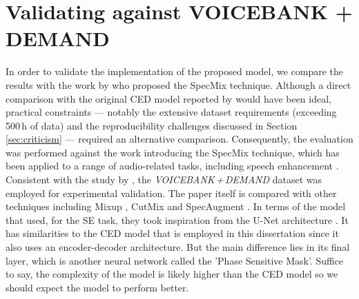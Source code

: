 \documentclass[logo,bsc,singlespacing,parskip,online]{infthesis}
\newcommand{\vbd}{\textit{VOICEBANK\,+\,DEMAND}\xspace}
\begin{document}
\section{Validating against VOICEBANK + DEMAND}
In order to validate the implementation of the proposed model, we compare the results 
with the work by \citet{kim_specmix_2021} who proposed the SpecMix technique. 
Although a direct comparison with the original CED model reported by \citet{tan18_interspeech} 
would have been ideal, practical constraints — notably the extensive dataset requirements 
(exceeding 500\,h of data) and the reproducibility challenges discussed in Section \ref{sec:criticism} — 
required an alternative comparison. Consequently, the evaluation was performed against the work 
introducing the SpecMix technique, which has been applied to a range of audio-related 
tasks, including speech enhancement \citep{kim_specmix_2021}. Consistent with the study 
by \citet{kim_specmix_2021}, the \vbd dataset was employed for experimental 
validation. The paper itself is compared with other techniques including Mixup \citep{zhang_mixup_2017},
CutMix \citep{yun_cutmix_2019} and SpecAugment \citep{park_specaugment_2019}. In terms 
of the model that \citet{kim_specmix_2021} used, for the SE task, they 
took inspiration from the U-Net architecture \citep{ronneberger_unet_2015}.
It has similarities to the CED model that is employed in this dissertation 
since it also uses an encoder-decoder architecture. But the main difference 
lies in its final layer, which is another neural network called the 
'Phase Sensitive Mask'. Suffice to say, the complexity of the model 
is likely higher than the CED model so we should expect the model 
to perform better.
\end{document}
